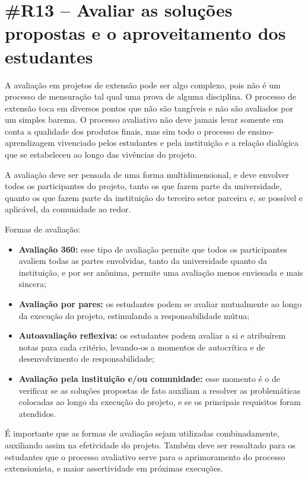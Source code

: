 \section*{\#R13 – Avaliar as soluções propostas e o aproveitamento dos estudantes}

A avaliação em projetos de extensão pode ser algo complexo, pois não é um processo de mensuração tal qual uma prova de alguma disciplina. O processo de extensão toca em diversos pontos que não são tangíveis e não são avaliados por um simples barema. O processo avaliativo não deve jamais levar somente em conta a qualidade dos produtos finais, mas sim todo o processo de ensino-aprendizagem vivenciado pelos estudantes e pela instituição e a relação dialógica que se estabeleceu ao longo das vivências do projeto.

A avaliação deve ser pensada de uma forma multidimensional, e deve envolver todos os participantes do projeto, tanto os que fazem parte da universidade, quanto os que fazem parte da instituição do terceiro setor parceira e, se possível e aplicável, da comunidade ao redor.

Formas de avaliação:

\begin{itemize}
    \item \textbf{Avaliação 360:} esse tipo de avaliação permite que todos os participantes avaliem todas as partes envolvidas, tanto da universidade quanto da instituição, e por ser anônima, permite uma avaliação menos enviesada e mais sincera;
    \item \textbf{Avaliação por pares:} os estudantes podem se avaliar mutualmente ao longo da execução do projeto, estimulando a responsabilidade mútua;
    \item \textbf{Autoavaliação reflexiva:} os estudantes podem avaliar a si e atribuírem notas para cada critério, levando-os a momentos de autocrítica e de desenvolvimento de responsabilidade;
    \item \textbf{Avaliação pela instituição e/ou comunidade:} esse momento é o de verificar se as soluções propostas de fato auxiliam a resolver as problemáticas colocadas ao longo da execução do projeto, e se os principais requisitos foram atendidos.
\end{itemize}

É importante que as formas de avaliação sejam utilizadas combinadamente, auxiliando assim na efetividade do projeto. Também deve ser ressaltado para os estudantes que o processo avaliativo serve para o aprimoramento do processo extensionista, e maior assertividade em próximas execuções.